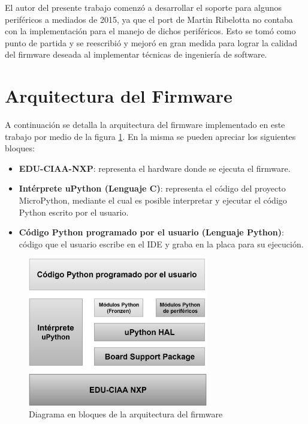 
El autor del presente trabajo comenzó a desarrollar el soporte para algunos periféricos a mediados de 2015, ya que el port de Martin Ribelotta no contaba con la implementación para el manejo de dichos periféricos. Esto se tomó como punto de partida y se reescribió y mejoró en gran medida para lograr la calidad del firmware deseada al implementar técnicas de ingeniería de software.

\section{Arquitectura del Firmware}
\label{sec:firmwareArq}

A continuación se detalla la arquitectura del firmware implementado en este trabajo por medio de la figura \ref{fig:firmwareArq}. En la misma se pueden apreciar los siguientes bloques:

\begin{itemize}
	\item \textbf{EDU-CIAA-NXP}: representa el hardware donde se ejecuta el firmware.
	\item \textbf{Intérprete uPython (Lenguaje C)}: representa el código del proyecto MicroPython, mediante el cual es posible interpretar y ejecutar el código Python escrito por el usuario.
	\item \textbf{Código Python programado por el usuario (Lenguaje Python)}: código que el usuario escribe en el IDE y graba en la placa para su ejecución.
\end{itemize}

\begin{figure}[ht]
  \centering
    \includegraphics[width=0.7\textwidth]{Figures/fig_firm_arquitectura}
  \caption{Diagrama en bloques de la arquitectura del firmware}
  \label{fig:firmwareArq}
\end{figure}

